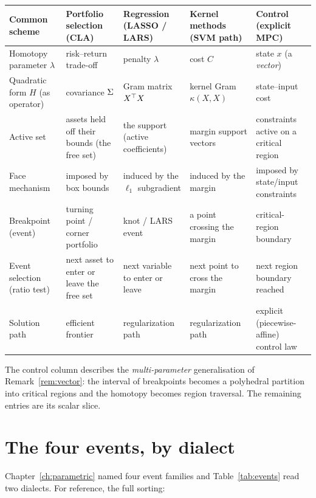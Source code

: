 \begin{center}
\footnotesize
\begin{tabular}{@{}p{}p{}p{}p{}p{}@{}}
\toprule
Common scheme & Portfolio selection (CLA) & Regression (LASSO / LARS) &
Kernel methods (SVM path) & Control (explicit MPC) \\
\midrule
Homotopy parameter $\lambda$ & risk--return trade-off & penalty $\lambda$ &
cost $C$ & state $x$ (a \emph{vector}) \\[2pt]
Quadratic form $H$ (as operator) & covariance $\Sigma$ & Gram matrix $X^{\top} X$ &
kernel Gram $\kappa(X,X)$ & state--input cost \\[2pt]
Active set & assets held off their bounds (the free set) &
the support (active coefficients) & margin support vectors &
constraints active on a critical region \\[2pt]
Face mechanism & imposed by box bounds & induced by the $\ell_1$ subgradient &
induced by the margin & imposed by state/input constraints \\[2pt]
Breakpoint (event) & turning point / corner portfolio & knot / LARS event &
a point crossing the margin & critical-region boundary \\[2pt]
Event selection (ratio test) & next asset to enter or leave the free set &
next variable to enter or leave & next point to cross the margin &
next region boundary reached \\[2pt]
Solution path & efficient frontier & regularization path & regularization path &
explicit (piecewise-affine) control law \\
\bottomrule
\end{tabular}
\end{center}

The control column describes the \emph{multi-parameter} generalisation of
Remark~\ref{rem:vector}: the interval of breakpoints becomes a polyhedral partition into
critical regions and the homotopy becomes region traversal. The remaining entries are
its scalar slice.

\section{The four events, by dialect}

Chapter~\ref{ch:parametric} named four event families and Table~\ref{tab:events} read
two dialects. For reference, the full sorting:

